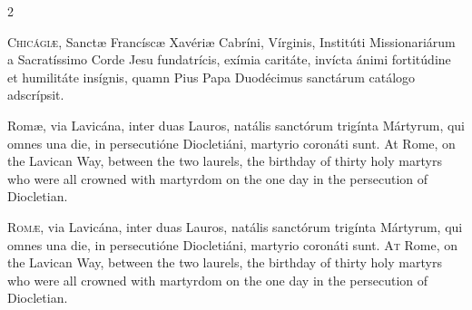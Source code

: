 \begin{paracol}{2}

\begin{american}

\lettrine[lines=2]{C}{hicágiæ,} Sanctæ Francíscæ Xavériæ
Cabríni, Vírginis, Institúti Missionariárum a Sacratíssimo Corde Jesu
fundatrícis, exímia caritáte, invícta ánimi fortitúdine et humilitáte
insígnis, quamn Pius Papa Duodécimus sanctárum catálogo adscrípsit.
\switchcolumn {}
\switchcolumn* 

Romæ, via Lavicána, inter duas Lauros, natális 
sanctórum trigínta Mártyrum, qui omnes una die, in persecutióne Diocletiáni, 
martyrio coronáti sunt.
\switchcolumn
{}
At Rome, on the Lavican Way, between the two laurels, the birthday of thirty 
holy martyrs who were all crowned with martyrdom on the one day in the 
persecution of Diocletian.

\end{american}

\begin{roman}
	\lettrine[lines=2]{R}{omæ,} via Lavicána, inter duas Lauros, natális 
	 sanctórum trigínta Mártyrum, qui omnes una die, in persecutióne Diocletiáni, 
	 martyrio coronáti sunt.
	\switchcolumn
	\lettrine[lines=2]{A}{t} Rome, on the Lavican Way, between the two laurels, the birthday of thirty 
	 holy martyrs who were all crowned with martyrdom on the one day in the 
	 persecution of Diocletian.
\end{roman}


\end{paracol}
